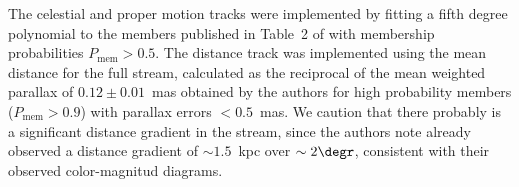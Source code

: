The celestial and proper motion tracks were implemented by fitting a fifth degree polynomial to the members published in Table~2 of \citet{Caldwell2020} with membership probabilities $P_\mathrm{mem}>0.5$. The distance track was implemented using the mean distance for the full stream, calculated as the reciprocal of the mean weighted parallax of $0.12 \pm 0.01$~mas obtained by the authors for high probability members ($P_\mathrm{mem}>0.9$) with parallax errors $<0.5$~mas. We caution that there probably is a significant distance gradient in the stream, since the authors note \citet{Sesar2015} already observed a distance gradient of $\sim1.5$~kpc over $\sim2\degr$, consistent with their observed color-magnitud diagrams. 
